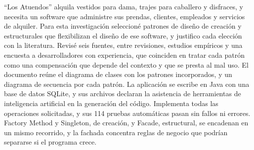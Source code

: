 %
%

{}
\begin{center}\textbf{\sectionTitleAbstract}\end{center}

\noindent ``Los Atuendos'' alquila vestidos para dama, trajes para caballero y disfraces, y necesita un software que administre sus prendas, clientes, empleados y servicios de alquiler. Para esta investigación seleccioné patrones de diseño de creación y estructurales que flexibilizan el diseño de ese software, y justifico cada elección con la literatura. Revisé seis fuentes, entre revisiones, estudios empíricos y una encuesta a desarrolladores con experiencia, que coinciden en tratar cada patrón como una compensación que depende del contexto y que se presta al mal uso. El documento reúne el diagrama de clases con los patrones incorporados, y un diagrama de secuencia por cada patrón. La aplicación se escribe en Java con una base de datos SQLite, y sus archivos declaran la asistencia de herramientas de inteligencia artificial en la generación del código. Implementa todas las operaciones solicitadas, y sus 114 pruebas automáticas pasan sin fallos ni errores. Factory Method y Singleton, de creación, y Facade, estructural, se encadenan en un mismo recorrido, y la fachada concentra reglas de negocio que podrían separarse si el programa crece.

